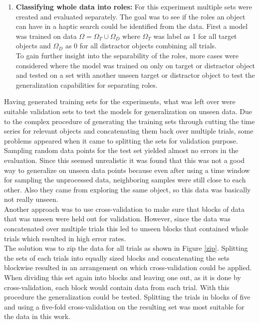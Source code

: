 \begin{enumerate}
	\item \textbf{Classifying whole data into roles:} For this experiment multiple sets were created and evaluated separately. The goal was to see if the roles an object can have in a haptic search could be identified from the data. First a model was trained on data $ \Omega = \Omega_{T} \cup \Omega_{D} $ where $ \Omega_{T} $ was label as 1 for all target objects and $ \Omega_{D} $ as 0 for all distractor objects combining all trials. \\
	To gain further insight into the separability of the roles, more cases were considered where the model was trained on only on target or distractor object and tested on a set with another unseen target or distractor object to test the generalization capabilities for separating roles.   
\end{enumerate}  

Having generated training sets for the experiments, what was left over were suitable validation sets to test the models for generalization on unseen data. Due to the complex procedure of generating the training sets through cutting the time series for relevant objects and concatenating them back over multiple trials, some problems appeared when it came to splitting the sets for validation purpose.\\ Sampling random data points for the test set yielded almost no errors in the evaluation. Since this seemed unrealistic it was found that this was not a good way to generalize on unseen data points because even after using a time window for sampling the unprocessed data, neighboring samples were still close to each other. Also they came from exploring the same object, so this data was basically not really unseen.\\
Another approach was to use cross-validation to make sure that blocks of data that was unseen were held out for validation. However, since the data was concatenated over multiple trials this led to unseen blocks that contained whole trials which resulted in high error rates. \\
The solution was to zip the data for all trials as shown in Figure \ref{zip}. Splitting the sets of each trials into equally sized blocks and concatenating the sets blockwise resulted in an arrangement on which cross-validation could be applied. When dividing this set again into blocks and leaving one out, as it is done by cross-validation, each block would contain data from each trial. With this procedure the generalization could be tested. Splitting the trials in blocks of five and using a five-fold cross-validation on the resulting set was most suitable for the data in this work.

